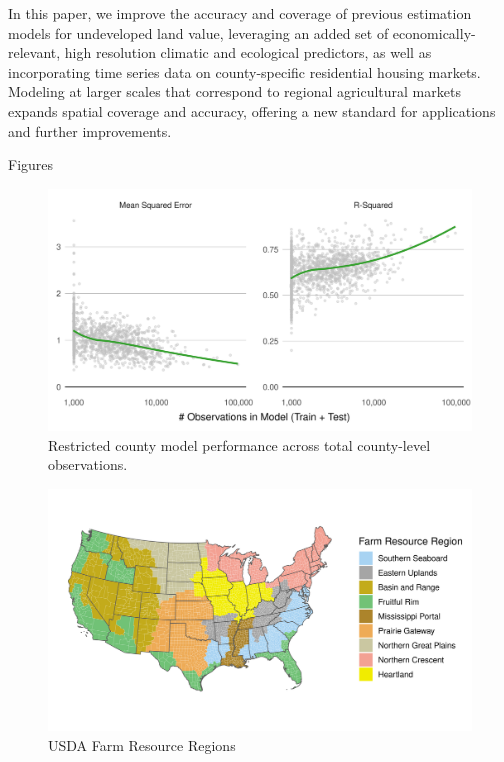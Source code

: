 \documentclass[12pt]{article}
\begin{document}
In this paper, we improve the accuracy and coverage of previous estimation models for undeveloped land value, leveraging an added set of economically-relevant, high resolution climatic and ecological predictors, as well as incorporating time series data on county-specific residential housing markets. Modeling at larger scales that correspond to regional agricultural markets expands spatial coverage and accuracy, offering a new standard for applications and further improvements. 

\newpage

\vspace*{200pt}

\begin{huge}
    \begin{center}
        Figures
    \end{center}
\end{huge}

\newpage

\begin{figure}[H]
    \centering
    \includegraphics[width=1\textwidth]{exhibits/compare_county_nobs_perf.png}
    \caption{Restricted county model performance across total county-level observations.}
    \label{fig:compare_county_nobs_perf}
\end{figure}

\begin{figure}[H]
    \centering
    \includegraphics[width=1\textwidth]{exhibits/FRR_map.png}
    \caption{USDA Farm Resource Regions}
    \label{fig:FRR_map}
\end{figure}
\end{document}

